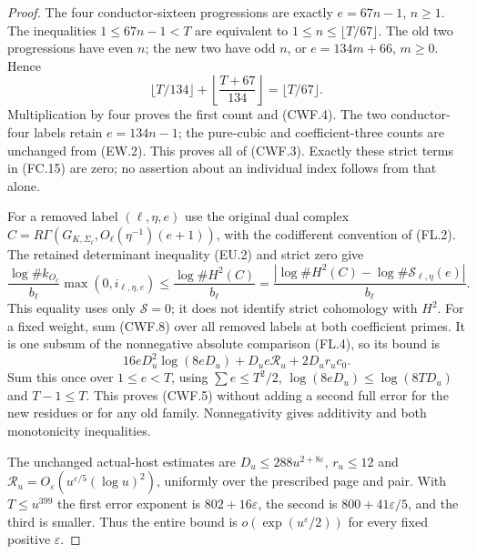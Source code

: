 \begin{proof}
The four conductor-sixteen progressions are exactly
$e=67n-1$, $n\geq1$.  The inequalities $1\leq67n-1<T$
are equivalent to $1\leq n\leq\lfloor T/67\rfloor$.
The old two progressions have even $n$; the new two have odd $n$,
or $e=134m+66$, $m\geq0$.  Hence
\[
 \lfloor T/134\rfloor+
 \left\lfloor\frac{T+67}{134}\right\rfloor
                         =\lfloor T/67\rfloor.
 \tag{CWF.7}
\]
Multiplication by four proves the first count and (CWF.4).
The two conductor-four labels retain $e=134n-1$; the pure-cubic
and coefficient-three counts are unchanged from (EW.2).
This proves all of (CWF.3).  Exactly these strict terms in (FC.15)
are zero; no assertion about an individual index follows from that alone.

For a removed label $(\ell,\eta,e)$ use the original dual complex
$C=R\Gamma(G_{K,\Sigma_\ell},O_\ell(\eta^{-1})(e+1))$,
with the codifferent convention of (FL.2).
The retained determinant inequality (EU.2) and strict zero give
\[
 \frac{\log\#k_{O_\ell}}{b_\ell}\max(0,i_{\ell,\eta,e})
 \leq\frac{\log\#H^2(C)}{b_\ell}
 =\frac{|\log\#H^2(C)-\log\#\mathcal S_{\ell,\eta}(e)|}{b_\ell}.
 \tag{CWF.8}
\]
This equality uses only $\mathcal S=0$; it does not identify
strict cohomology with $H^2$.
For a fixed weight, sum (CWF.8) over all removed labels at both
coefficient primes.  It is one subsum of the nonnegative absolute
comparison (FL.4), so its bound is
\[
        16eD_u^2\log(8eD_u)+D_ue\mathcal R_u+2D_ur_uc_0.
 \tag{CWF.9}
\]
Sum this once over $1\leq e<T$, using
$\sum e\leq T^2/2$, $\log(8eD_u)\leq\log(8TD_u)$ and
$T-1\leq T$.  This proves (CWF.5) without adding a second full
error for the new residues or for any old family.
Nonnegativity gives additivity and both monotonicity inequalities.

The unchanged actual-host estimates are
$D_u\leq288u^{2+8\varepsilon}$, $r_u\leq12$ and
$\mathcal R_u=O_\varepsilon(u^{\varepsilon/5}(\log u)^2)$,
uniformly over the prescribed page and pair.
With $T\leq u^{399}$ the first error exponent is
$802+16\varepsilon$, the second is $800+41\varepsilon/5$,
and the third is smaller.  Thus the entire bound is
$o(\exp(u^\varepsilon/2))$ for every fixed positive $\varepsilon$.


\end{proof}
